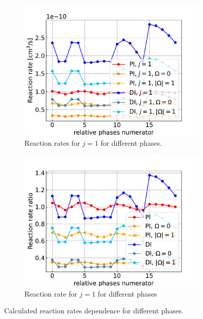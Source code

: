 \documentclass{article}
\begin{document}
    \begin{figure}[H]
        \centering
        \begin{subfigure}{.4\linewidth}
            \centering
            \includegraphics[width=\linewidth]{coriolis_reaction_rate_1_phases.pdf}
            \caption{Reaction rates for $j = 1$ for different phases.}
        \end{subfigure}
        \begin{subfigure}{.4\linewidth}
            \centering
            \includegraphics[width=\linewidth]{coriolis_reaction_rate_ratios_phases.pdf}
            \caption{Reaction rate for $j = 1$ for different phases}
        \end{subfigure}     
        \caption{Calculated reaction rates dependence for different phases.}
    \end{figure}
\end{document}
